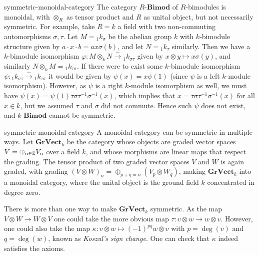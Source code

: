 \begin{example}{symmetric-monoidal-category}
    The category $R\text{-}\textbf{Bimod}$ of $R$-bimodules is monoidal, with $\otimes_R$ as tensor product and $R$ as unital object, but not necessarily symmetric. For example, take $R = k$ a field with two non-commuting automorphisms $\sigma, \tau$. Let $M = {}_1 k_\sigma$ be the abelian group $k$ with $k$-bimodule structure given by $a \cdot x \cdot b = ax \sigma(b)$, and let $N = {}_1 k_\tau$ similarly. Then we have a $k$-bimodule isomorphism $\varphi : M \otimes_k N \xrightarrow{\sim} {}_1 k_{\sigma \tau}$ given by $x \otimes y \mapsto x \sigma(y)$, and similarly $N \otimes_k M = {}_1 k_{\tau \sigma}$. If there were to exist some $k$-bimodule isomorphism $\psi : {}_1 k_{\sigma \tau} \xrightarrow{\sim} {}_1 k_{\tau \sigma}$ it would be given by $\psi(x) = x \psi(1)$ (since $\psi$ is a left $k$-module isomorphism). However, as $\psi$ is a right $k$-module isomorphism as well, we must have $\psi(x) = \psi(1) \tau \sigma \tau^{-1} \sigma^{-1} (x)$, which implies that $x = \tau \sigma \tau^{-1} \sigma^{-1} (x)$ for all $x \in k$, but we assumed $\tau$ and $\sigma$ did not commute. Hence such $\psi$ does not exist, and $k\text{-}\textbf{Bimod}$ cannot be symmetric.
\end{example}

\begin{example}{symmetric-monoidal-category}
    A monoidal category can be symmetric in multiple ways. Let $\textbf{GrVect}_k$ be the category whose objects are graded vector spaces $V = \oplus_{n \in \mathbb{Z}} V_n$ over a field $k$, and whose morphisms are linear maps that respect the grading. The tensor product of two graded vector spaces $V$ and $W$ is again graded, with grading $(V \otimes W)_n = \oplus_{p + q = n} (V_p \otimes W_q)$, making $\textbf{GrVect}_k$ into a monoidal category, where the unital object is the ground field $k$ concentrated in degree zero.
        
    There is more than one way to make $\textbf{GrVect}_k$ symmetric. As the map $V \otimes W \to W \otimes V$ one could take the more obvious map $\tau : v \otimes w \to w \otimes v$. However, one could also take the map $\kappa : v \otimes w \mapsto (-1)^{pq} w \otimes v$ with $p = \deg(v)$ and $q = \deg(w)$, known as \textit{Koszul's sign change}. One can check that $\kappa$ indeed satisfies the axioms.
\end{example}

